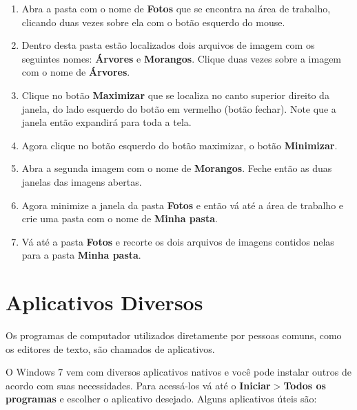 \documentclass[12pt]{article}
\begin{document}
		\begin{enumerate}
			
			\item Abra a pasta com o nome de {\bf Fotos} que se encontra na área de trabalho, clicando duas vezes sobre ela com o botão esquerdo do mouse. 
			
			
			\item Dentro desta pasta estão localizados dois arquivos de imagem com os seguintes nomes: {\bf Árvores} e {\bf Morangos}. Clique duas vezes sobre a imagem com o nome de {\bf Árvores}.
			
			\item Clique no botão {\bf Maximizar} que se localiza no canto superior direito da janela, do lado esquerdo do botão em vermelho (botão fechar). Note que a janela então expandirá para toda a tela.
			
			\item Agora clique no botão esquerdo do botão maximizar, o botão {\bf Minimizar}.
			
			\item Abra a segunda imagem com o nome de {\bf Morangos}. Feche então as duas janelas das imagens abertas.
			
			\item Agora minimize a janela da pasta {\bf Fotos} e então vá até a área de trabalho e crie uma pasta com o nome de {\bf Minha pasta}. 
			
			\item Vá até a pasta {\bf Fotos} e recorte os dois arquivos de imagens contidos nelas para a pasta {\bf Minha pasta}.
				
		\end{enumerate}
		
		
		\section{Aplicativos Diversos}
	
			Os programas de computador utilizados diretamente por pessoas comuns, como os editores de texto, são chamados de aplicativos.
			
			O Windows 7 vem com diversos aplicativos nativos e você pode instalar outros de acordo com suas necessidades. Para acessá-los vá até o {\bf Iniciar$>$Todos os programas} e escolher o aplicativo desejado. Alguns aplicativos úteis são:
			
\end{document}
